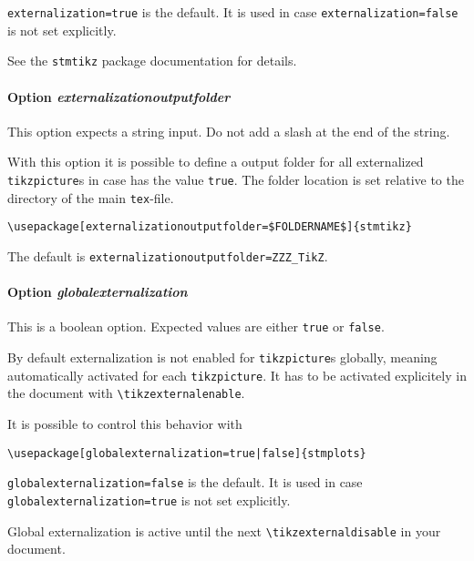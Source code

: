 \documentclass[%
  type=article,%
  layout=koma,%
  date=true,%
  hyperref=true,%
  listings=true,%
  math=true,%
  plots=false,%
]{stmtext}
\begin{document}
\texttt{externalization=true} is the default. It is used in case \texttt{externalization=false} is not set explicitly.

See the \texttt{stmtikz} package documentation for details.

\paragraph{Option \protect\textit{externalizationoutputfolder}}
\label{sec:usage:preamble:wholepackage:options:outputfolder}

This option expects a string input. Do not add a slash at the end of the string.

With this option it is possible to define a output folder for all externalized \texttt{tikzpicture}s in case  has the value \texttt{true}. The folder location is set relative to the directory of the main \texttt{tex}-file.

\begin{verbatim}
\usepackage[externalizationoutputfolder=$FOLDERNAME$]{stmtikz}
\end{verbatim}

The default is \texttt{externalizationoutputfolder=ZZZ\_TikZ}.

\paragraph{Option \protect\textit{globalexternalization}}
\label{sec:usage:preamble:wholepackage:options:globalexternalization}

This is a boolean option.  Expected values are either \texttt{true} or \texttt{false}. 

By default externalization is not enabled for \texttt{tikzpicture}s globally, meaning automatically activated for each \texttt{tikzpicture}. It has to be activated explicitely in the document with \texttt{\textbackslash tikzexternalenable}.

It is possible to control this behavior with 

\begin{verbatim}
\usepackage[globalexternalization=true|false]{stmplots}
\end{verbatim}

\texttt{globalexternalization=false} is the default. It is used in case \texttt{globalexternalization=true} is not set explicitly.

Global externalization is active until the next \texttt{\textbackslash tikzexternaldisable} in your document.
\end{document}
